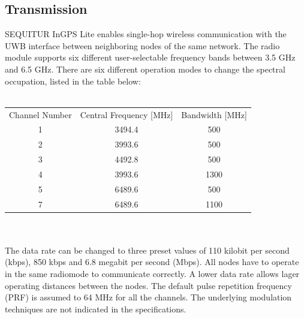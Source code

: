 \subsection{Transmission}
SEQUITUR InGPS Lite enables single-hop wireless communication with the UWB interface between neighboring nodes of the same network. 
The radio module supports six different user-selectable frequency bands between 3.5 GHz and 6.5 GHz. There are six different operation modes to change the spectral occupation, listed in the table below:\\
\\
\begin{tabular}{c c c}
Channel Number  & Central Frequency [MHz] & Bandwidth [MHz]\\
1 & 3494.4 & 500\\
2 & 3993.6 & 500\\
3 & 4492.8 & 500\\
4 & 3993.6 & 1300\\
5 & 6489.6 & 500\\
7 & 6489.6 & 1100\\
\end{tabular}
\\
\\
The data rate can be changed to three preset values of 110 kilobit per second (kbps), 850 kbps and 6.8 megabit per second (Mbps). All nodes have to operate in the same radiomode to communicate correctly. A lower data rate allows lager operating distances between the nodes. 
The default pulse repetition frequency (PRF) is assumed to 64 MHz for all the channels.
The underlying modulation techniques are not indicated in the specifications. \cite{Usermanual} \cite{Beginnersguide}

